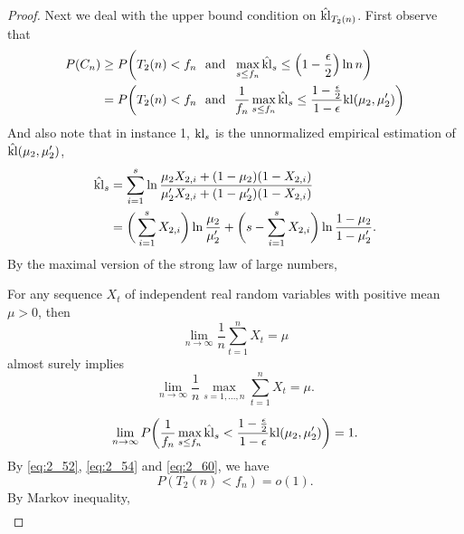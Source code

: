 \begin{proof}
    Next we deal with the upper bound condition on $\hat {{\mathop{\mathrm{kl}}}}_{T_2(n)}$.
    First observe that
    \begin{align}
        P(C_n)
            &\ge P\bigg(T_2(n)<f_n~~\text{and}~~\max_{s\le f_n}\hat{{\mathop{\mathrm{kl}}}}_s\le\Big(1-\frac{\epsilon}{2}\Big)\ln n\bigg) \\
            &=  P\bigg(T_2(n)<f_n~~\text{and}~~\frac{1}{f_n}\max_{s\le f_n}\hat{{\mathop{\mathrm{kl}}}}_s\le\frac{1-\frac{\epsilon}{2}}{1-\epsilon}{\mathop{\mathrm{kl}}}(\mu_2,\mu_2')\bigg)\label{eq:2_54}
    \end{align}
    And also note that in instance 1,
    ${\mathop{\mathrm{kl}}}_s$ is the unnormalized empirical estimation of $\hat{{\mathop{\mathrm{kl}}}}(\mu_2,\mu_2')$,
    \begin{align}
        \hat{{\mathop{\mathrm{kl}}}}_s
            &= \sum_{i=1}^s \ln
                \frac{\mu_2 X_{2,i} + (1-\mu_2) (1-X_{2,i})}
                {\mu_2' X_{2,i} + (1-\mu_2')(1-X_{2,i})} \\
            &= \bigg(\sum_{i=1}^s X_{2,i}\bigg)\ln\frac{\mu_2}{\mu_2'} +
                \bigg(s-\sum_{i=1}^s X_{2,i}\bigg)\ln\frac{1-\mu_2}{1-\mu_2'}.
    \end{align}
    By the maximal version of the strong law of large numbers,
    \begin{framed}
        \begin{fact}
            For any sequence $X_t$ of independent real random variables with positive mean $\mu>0$,
            then
            \begin{equation}
                \lim_{n\to\infty}\frac{1}{n}\sum_{t=1}^n X_t=\mu
            \end{equation}
            almost surely implies
            \begin{equation}
                \lim_{n\to\infty}\frac{1}{n}\max_{s=1,\dots,n}\sum_{t=1}^n X_t=\mu.
            \end{equation}
        \end{fact}
    \end{framed}
    \begin{align}
        \lim_{n\to\infty}P\bigg(\frac{1}{f_n}\max_{s\le f_n}\hat{{\mathop{\mathrm{kl}}}}_s<\frac{1-\frac{\epsilon}{2}}{1-\epsilon}{\mathop{\mathrm{kl}}}(\mu_2,\mu_2')\bigg)=1. \label{eq:2_60}
    \end{align}
    By \eqref{eq:2_52}, \eqref{eq:2_54} and \eqref{eq:2_60},
    we have
    \begin{equation}
        P(T_2(n)<f_n)=o(1).
    \end{equation}
    By Markov inequality,
    \begin{align}

\end{align}
\end{proof}
